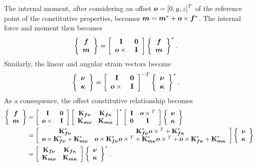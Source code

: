 The internal moment, after considering an offset $\T{o}=\sqbr{0, y, z}^T$
of the reference point of the constitutive properties, becomes
$\T{m}=\T{m}^* + \T{o}\times\T{f}^*$.
The internal force and moment then becomes
\begin{align}
	\cubr{\cvvect{
		\T{f} \\
		\T{m}
	}}
	&= \sqbr{\matr{cc}{
		\TT{I} & \TT{0} \\
		\T{o}\times{} & \TT{I}
	}}
	\cubr{\cvvect{
		\T{f} \\
		\T{m}
	}}^*
	\label{eq:EL:BEAM:ANISOTROPIC-T}
	.
\end{align}
Similarly, the linear and angular strain vectors become
\begin{align}
	\cubr{\cvvect{
		\T{\nu} \\
		\T{\kappa}
	}}
	&= \sqbr{\matr{cc}{
		\TT{I} & \TT{0} \\
		\T{o}\times{} & \TT{I}
	}}^{-T}
	\cubr{\cvvect{
		\T{\nu} \\
		\T{\kappa}
	}}^*
	.
\end{align}
As a consequence, the offset constitutive relationship becomes
\begin{align}
	\cubr{\cvvect{
		\T{f} \\
		\T{m}
	}}
	&=
	\sqbr{\matr{cc}{
		\TT{I} & \TT{0} \\
		\T{o}\times{} & \TT{I}
	}}
	\sqbr{\matr{cc}{
		\TT{K}_{\T{f}\T{\nu}} & \TT{K}_{\T{f}\T{\kappa}} \\
		\TT{K}_{\T{m}\T{\nu}} & \TT{K}_{\T{m}\T{\kappa}}
	}}^*
	\sqbr{\matr{cc}{
		\TT{I} & \T{o}\times{}^T \\
		\TT{0} & \TT{I}
	}}
	\cubr{\cvvect{
		\T{\nu} \\
		\T{\kappa}
	}}
	\nonumber \\
	&=
	\sqbr{\matr{cc}{
		\TT{K}_{\T{f}\T{\nu}}^*
		& \TT{K}_{\T{f}\T{\nu}}^* \T{o}\times{}^T
			+ \TT{K}_{\T{f}\T{\kappa}}^* \\
		\T{o}\times\TT{K}_{\T{f}\T{\nu}}^*
			+ \TT{K}_{\T{m}\T{\nu}}^*
		& \T{o}\times\TT{K}_{\T{f}\T{\nu}}^* \T{o}\times{}^T
			+ \TT{K}_{\T{m}\T{\nu}}^* \T{o}\times{}^T
			+ \T{o}\times\TT{K}_{\T{f}\T{\kappa}}^*
			+ \TT{K}_{\T{m}\T{\kappa}}^*
	}}
	\cubr{\cvvect{
		\T{\nu} \\
		\T{\kappa}
	}}
	\nonumber \\
	&=
	\sqbr{\matr{cc}{
		\TT{K}_{\T{f}\T{\nu}} & \TT{K}_{\T{f}\T{\kappa}} \\
		\TT{K}_{\T{m}\T{\nu}} & \TT{K}_{\T{m}\T{\kappa}}
	}}
	\cubr{\cvvect{
		\T{\nu} \\
		\T{\kappa}
	}}^*
	.
\end{align}

